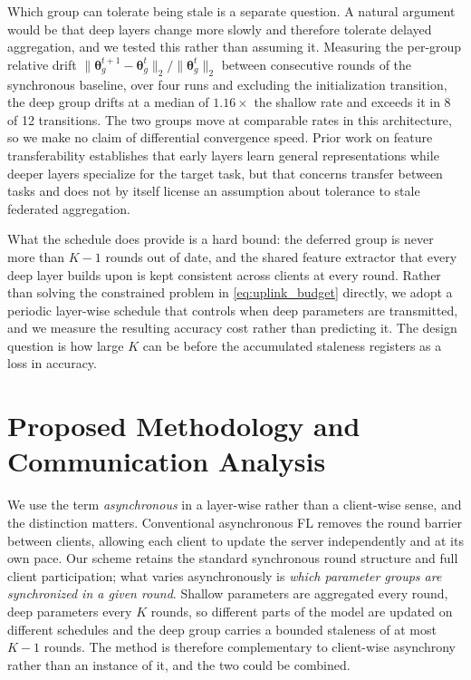 \documentclass[10pt,conference]{IEEEtran}
\begin{document}
Which group can tolerate being stale is a separate question. A natural argument would be that deep layers change more slowly and therefore tolerate delayed aggregation, and we tested this rather than assuming it. Measuring the per-group relative drift $\lVert\boldsymbol{\theta}_g^{t+1}-\boldsymbol{\theta}_g^{t}\rVert_2 / \lVert\boldsymbol{\theta}_g^{t}\rVert_2$ between consecutive rounds of the synchronous baseline, over four runs and excluding the initialization transition, the deep group drifts at a median of $1.16\times$ the shallow rate and exceeds it in 8 of 12 transitions. The two groups move at comparable rates in this architecture, so we make no claim of differential convergence speed. Prior work on feature transferability \cite{yosinski2014} establishes that early layers learn general representations while deeper layers specialize for the target task, but that concerns transfer between tasks and does not by itself license an assumption about tolerance to stale federated aggregation.

What the schedule does provide is a hard bound: the deferred group is never more than $K-1$ rounds out of date, and the shared feature extractor that every deep layer builds upon is kept consistent across clients at every round. Rather than solving the constrained problem in \eqref{eq:uplink_budget} directly, we adopt a periodic layer-wise schedule that controls when deep parameters are transmitted, and we measure the resulting accuracy cost rather than predicting it. The design question is how large $K$ can be before the accumulated staleness registers as a loss in accuracy.


\section{Proposed Methodology and Communication Analysis}

We use the term \emph{asynchronous} in a layer-wise rather than a client-wise sense, and the distinction matters. Conventional asynchronous FL removes the round barrier between clients, allowing each client to update the server independently and at its own pace. Our scheme retains the standard synchronous round structure and full client participation; what varies asynchronously is \emph{which parameter groups are synchronized in a given round}. Shallow parameters are aggregated every round, deep parameters every $K$ rounds, so different parts of the model are updated on different schedules and the deep group carries a bounded staleness of at most $K-1$ rounds. The method is therefore complementary to client-wise asynchrony rather than an instance of it, and the two could be combined.
\end{document}

